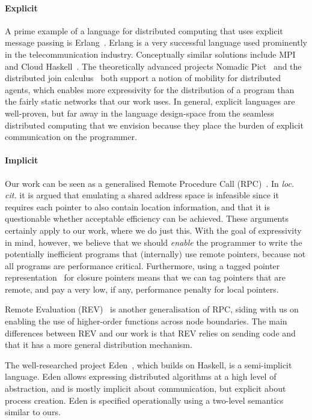 \documentclass{article}
\theoremstyle{definition}
\begin{document}
\paragraph*{Explicit}
A prime example of a language for distributed computing that uses explicit
message passing is Erlang~\cite{DBLP:books/daglib/0073501}. Erlang is a very
successful language used prominently in the telecommunication industry.
Conceptually similar solutions include MPI~\cite{gropp1999using} and Cloud
Haskell~\cite{DBLP:conf/haskell/EpsteinBJ11}.
The theoretically advanced projects Nomadic
Pict~\cite{DBLP:journals/ieeecc/WojciechowskiS00} and the distributed join
calculus~\cite{DBLP:conf/concur/FournetGLMR96} both support a notion of
mobility for distributed agents, which enables more expressivity for the
distribution of a program than the fairly static networks that our work uses.
In general, explicit languages are well-proven, but far away in the language
design-space from the seamless distributed computing that we envision because
they place the burden of explicit communication on the programmer.


\paragraph*{Implicit}
Our work can be seen as a generalised Remote Procedure
Call (RPC)~\cite{DBLP:journals/tocs/BirrelN84}.  In \emph{loc. cit.} it is argued
that emulating a shared address space is infeasible since it requires each
pointer to also contain location information, and that it is questionable
whether acceptable efficiency can be achieved.  These arguments certainly apply
to our work, where we do just this. With the goal of expressivity in mind,
however, we believe that we should \emph{enable} the programmer to write the
potentially inefficient programs that (internally) use remote pointers, because
not all programs are performance critical. Furthermore, using a tagged pointer
representation~\cite{DBLP:conf/icfp/MarlowYJ07} for closure pointers means that
we can tag pointers that are remote, and pay a very low, if any, performance
penalty for local pointers.

Remote Evaluation (REV)~\cite{DBLP:journals/toplas/StamosG90} is another
generalisation of RPC, siding with us on enabling the use of
higher-order functions across node boundaries. The main differences between REV
and our work is that REV relies on sending code and that it has a more general
distribution mechanism.

The well-researched project Eden~\cite{DBLP:journals/jfp/LoogenOP05}, which
builds on Haskell, is a semi-implicit language. Eden allows expressing
distributed algorithms at a high level of abstraction, and is mostly implicit
about communication, but explicit about process creation. Eden is specified
operationally using a two-level semantics similar to ours.
\end{document}
